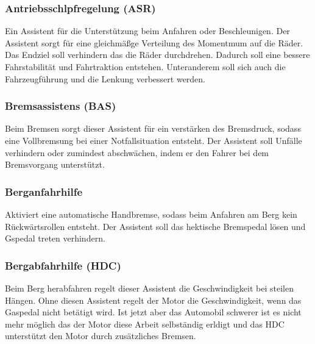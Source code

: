         \subsubsection{Antriebsschlpfregelung (ASR)}
        Ein Assistent für die Unterstützung beim Anfahren oder Beschleunigen. Der
        Assistent sorgt für eine gleichmäßge Verteilung des Momentmum auf die Räder.
        Das Endziel soll verhindern das die Räder durchdrehen. Dadurch soll eine 
        bessere Fahrstabilität und Fahrtraktion entstehen. Unteranderem soll sich auch 
        die Fahrzeugführung und die Lenkung verbessert werden.
        ~\cite{assistenzsysteme.PB2} ~\cite{ASR.PB1} ~\cite{ASR.PB2} 

        \subsubsection{Bremsassistens (BAS)}
        Beim Bremsen sorgt dieser Assistent für ein verstärken des Bremsdruck, sodass
        eine Vollbremsung bei einer Notfallsituation entsteht. Der Assistent soll Unfälle 
        verhindern oder zumindest abschwächen, indem er den Fahrer bei dem Bremsvorgang 
        unterstützt.
        ~\cite{assistenzsysteme.PB2} ~\cite{bremsassi.PB1} ~\cite{bremsassi.PB2}

        \subsubsection{Berganfahrhilfe}
        Aktiviert eine automatische Handbremse, sodass beim Anfahren am Berg kein Rückwärtsrollen
        entsteht. Der Assistent soll das hektische Bremspedal lösen und Gspedal treten 
        verhindern.
        ~\cite{berganfahr.PB1} ~\cite{berganfahr.PB2}  ~\cite{assistenzsysteme.PB2}
        
        \subsubsection{Bergabfahrhilfe (HDC)}
        Beim Berg herabfahren regelt dieser Assistent die Geschwindigkeit bei steilen Hängen. 
        Ohne diesen Assistent regelt der Motor die Geschwindigkeit, wenn das Gaspedal nicht 
        betätigt wird. Ist jetzt aber das Automobil schwerer ist es nicht mehr möglich das 
        der Motor diese Arbeit selbständig erldigt und das HDC unterstützt den Motor durch 
        zusätzliches Bremsen.
        ~\cite{assistenzsysteme.PB2} ~\cite{bergabfahr.PB1} 

